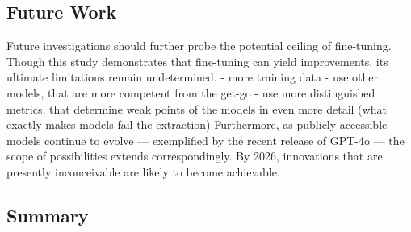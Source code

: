 \subsection{Future Work}\label{sec:future_work}
Future investigations should further probe the potential ceiling of fine-tuning. Though this study demonstrates that fine-tuning can yield improvements, its ultimate limitations remain undetermined. 
- more training data
- use other models, that are more competent from the get-go
- use more distinguished metrics, that determine weak points of the models in even more detail (what exactly makes models fail the extraction)
Furthermore, as publicly accessible models continue to evolve — exemplified by the recent release of GPT-4o — the scope of possibilities extends correspondingly. By 2026, innovations that are presently inconceivable are likely to become achievable.

\subsection{Summary}\label{sec:summary}
